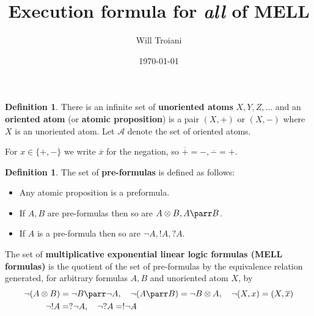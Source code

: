 \documentclass[12pt]{article}
\title{Execution formula for \emph{all} of MELL}
\author{Will Troiani}
\date{\today}
\theoremstyle{plain}
\theoremstyle{definition}
\newtheorem{defn}[thm]{Definition} %
\newcommand{\call}[1]{\mathcal{#1}}
\begin{document}
\maketitle

\begin{defn}
\label{def:atomic_atoms}
There is an infinite set of \textbf{unoriented atoms} $X,Y,Z,\ldots$ and an \textbf{oriented atom} (or \textbf{atomic proposition}) is a pair $(X,+)$ or $(X,-)$ where $X$ is an unoriented atom. Let $\call{A}$ denote the set of oriented atoms.
\end{defn}

For $x \in \{ +, - \}$ we write $\overline{x}$ for the negation, so $\overline{+} = -, \overline{-} = +$.

\begin{defn}
The set of \textbf{pre-formulas} is defined as follows:
\begin{itemize}
	\item Any atomic proposition is a preformula.
	\item If $A,B$ are pre-formulas then so are $A \otimes B, A \parr B$.
	\item If $A$ is a pre-formula then so are $\neg A, ! A, ? A$.
\end{itemize}
The set of \textbf{multiplicative exponential linear logic formulas (MELL formulas)} is the quotient of the set of pre-formulas by the equivalence relation generated, for arbitrary formulas $A, B$ and unoriented atom $X$, by
\begin{align*}
\neg(A \otimes B) &= \neg B \parr \neg A,\quad \neg(A \parr B) = \neg B \otimes A,\quad \neg(X, x) = (X, \overline{x})\\
\neg !A &= ? \neg A,\quad \neg ?A = !\neg A
\end{align*}
\end{defn}
\end{document}
